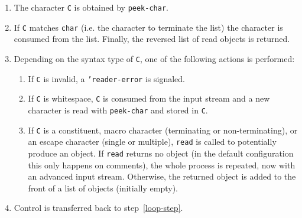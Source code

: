 \documentclass[a4paper,10pt,twoside]{report}
\newcommand{\sym}[1]{\texttt{#1}}
\newcommand{\fun}[1]{\texttt{#1}}
\newcommand{\Read}{\fun{read}}
\begin{document}
\begin{enumerate}
\item The character \sym{C} is obtained by \fun{peek-char}.
\item \label{loop-step}
  If \sym{C} matches \sym{char} (i.e. the character to terminate the list)
  the character is consumed from the list.  Finally, the reversed list of read
  objects is returned.
\item Depending on the syntax type of \sym{C}, one of the following actions is
  performed:
  \begin{enumerate}
  \item If \sym{C} is invalid, a \sym{'reader-error} is signaled.
  \item If \sym{C} is whitespace, \sym{C} is consumed from the input stream and
    a new character is read with \fun{peek-char} and stored in
    \sym{C}.
  \item If \sym{C} is a constituent, macro character (terminating or
    non-terminating), or an escape character (single or multiple), \Read{} is
    called to potentially produce an object.  If \Read{} returns no object (in
    the default configuration this only happens on comments), the whole process
    is repeated, now with an advanced input stream.  Otherwise, the returned
    object is added to the front of a list of objects (initially empty).
  \end{enumerate}
\item Control is transferred back to step~\ref{loop-step}.
\end{enumerate}
\end{document}
